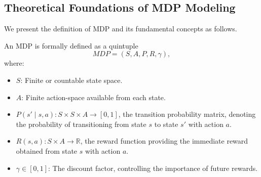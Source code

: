 \subsection{Theoretical Foundations of MDP Modeling}

We present the definition of MDP and its fundamental concepts as follows.

\begin{definition}
An MDP is formally defined as a quintuple 
\begin{equation}
    MDP = (S, A, P, R, \gamma),
    \label{eq:MDP_def}
\end{equation}
where:
\begin{itemize}
    \item $S$: Finite or countable state space.
    \item $A$: Finite action-space available from each state.
    \item $P(s' \mid s, a): S \times S \times A \to [0, 1]$, the transition probability matrix, denoting the probability of transitioning from state $s$ to state $s'$ with action $a$.
    \item $R(s, a): S \times A \to \mathbb{R}$, the reward function providing the immediate reward obtained from state $s$ with action $a$.
    \item $\gamma \in [0, 1]$: The discount factor, controlling the importance of future rewards. %
\end{itemize}
\end{definition}

